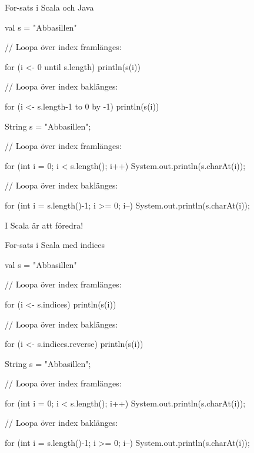 \begin{Slide}{For-sats i Scala och Java}
\begin{multicols}{2}
\noindent{}
\begin{CodeSmall}[basicstyle=\ttfamily\SlideFontSize{6}{8},backgroundcolor=\color{white},
  frame=none]
val s = "Abbasillen"

// Loopa över index framlänges:

for (i <- 0 until s.length) {
  println(s(i))
}

// Loopa över index baklänges:

for (i <- s.length-1 to 0 by -1) {
  println(s(i))
}
\end{CodeSmall}

\columnbreak

\noindent{}
\begin{CodeSmall}[language=Java,basicstyle=\ttfamily\SlideFontSize{6}{8},backgroundcolor=\color{white},
  frame=none]
String s = "Abbasillen";

// Loopa över index framlänges:

for (int i = 0; i < s.length(); i++) {
    System.out.println(s.charAt(i));
}

// Loopa över index baklänges:

for (int i = s.length()-1; i >= 0; i--) {
    System.out.println(s.charAt(i));
}
\end{CodeSmall}
\end{multicols}
I Scala är  att föredra!
\end{Slide}


\begin{Slide}{For-sats i Scala med indices}
\begin{multicols}{2}
\noindent{}
\begin{CodeSmall}[basicstyle=\ttfamily\SlideFontSize{6}{8},backgroundcolor=\color{white},
  frame=none]
val s = "Abbasillen"

// Loopa över index framlänges:

for (i <- s.indices) {
  println(s(i))
}

// Loopa över index baklänges:

for (i <- s.indices.reverse) {
  println(s(i))
}
\end{CodeSmall}

\columnbreak

\noindent{}
\begin{CodeSmall}[language=Java,basicstyle=\footnotesize\ttfamily\SlideFontSize{6}{8},backgroundcolor=\color{white},
  frame=none]
String s = "Abbasillen";

// Loopa över index framlänges:

for (int i = 0; i < s.length(); i++) {
    System.out.println(s.charAt(i));
}

// Loopa över index baklänges:

for (int i = s.length()-1; i >= 0; i--) {
    System.out.println(s.charAt(i));
}
\end{CodeSmall}
\end{multicols}
\end{Slide}






